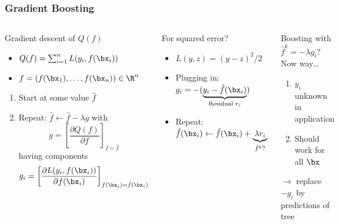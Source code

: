 \begin{frame}
	\frametitle{Gradient Boosting}
	\begin{columns}[onlytextwidth]
		\begin{block}{Gradient descent of $Q(f)$}
			\begin{itemize}
				\item $Q(f) = \sum_{i = 1}^n L(y_i, f(\bx_i))$
				\item $f = \left(f(\bx_1), \dots, f(\bx_n)\right) \in \R^n$
			\end{itemize}
			
			\begin{enumerate}
				\item Start at some value $\hat f$
				\item Repeat: $\hat f \leftarrow \hat f - \lambda g$ with
				$$
				g = \left[\frac{\partial Q(f)}{\partial f}\right]_{f = \hat f}
				$$
				having components
				$$
				g_i = \left[\frac{\partial L(y_i, f(\bx_i))}{\partial f(\bx_i)}\right]_{f(\bx_i) = \hat f(\bx_i)}
				$$
			\end{enumerate}
		\end{block}
		
		\begin{block}{For squared error?}
			\begin{itemize}
				\item $L(y, z) = (y-z)^2/2$
				\item Plugging in:
				$
				g_i = -(\underbrace{y_i - \hat f(\bx_i)}_{\text{Residual } r_i})
				$
				\item Repeat: $\hat f(\bx_i) \leftarrow \hat f(\bx_i) + \underbrace{\lambda r_i}_{\hat f^k \text{?}}$
			\end{itemize}
		\end{block}
		\begin{block}{Boosting with $\hat f^k = -\lambda g_i$? Now way\dots} 
			\begin{enumerate}
				\item $y_i$ unknown in application
				\item Should work for all $\bx$
			\end{enumerate}
			$\rightarrow$ replace $-g_i$ by predictions of tree
		\end{block}
	\end{columns}
\end{frame}

